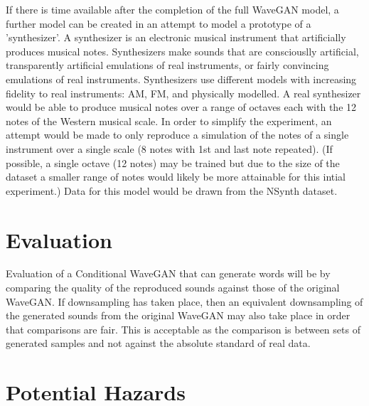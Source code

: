 \documentclass{article}
\begin{document}
If there is time available after the completion of the full WaveGAN model, a further model can be created in an attempt to model a prototype of a 'synthesizer'.
A synthesizer is an electronic musical instrument that artificially produces musical notes.
Synthesizers make sounds that are consciouslly artificial, transparently artificial emulations of real instruments, or fairly convincing emulations of real instruments.
Synthesizers use different models with increasing fidelity to real instruments: AM, FM, and physically modelled.
\newline
\newline
A real synthesizer would be able to produce musical notes over a range of octaves each with the 12 notes of the Western musical scale.
In order to simplify the experiment, an attempt would be made to only reproduce a simulation of the notes of a single instrument over a single scale (8 notes with 1st and last note repeated).
(If possible, a single octave (12 notes) may be trained but due to the size of the dataset a smaller range of notes would likely be more attainable for this intial experiment.)
\newline
\newline
Data for this model would be drawn from the NSynth dataset.

\section{Evaluation}

Evaluation of a Conditional WaveGAN that can generate words will be by comparing the quality of the reproduced sounds against those of the original WaveGAN.
If downsampling has taken place, then an equivalent downsampling of the generated sounds from the original WaveGAN may also take place in order that comparisons are fair.
This is acceptable as the comparison is between sets of generated samples and not against the absolute standard of real data.

\section{Potential Hazards}
\end{document}
